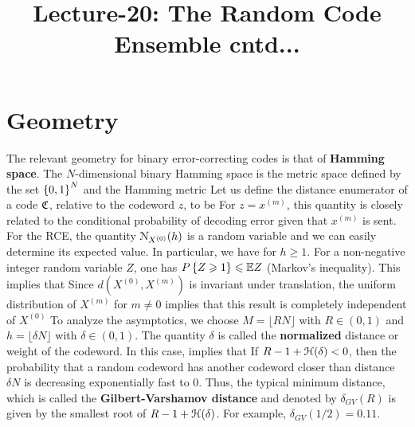 \documentclass[letterpaper,english,10pt]{article}
\title{Lecture-20: The Random Code Ensemble cntd...}
\begin{document}
\maketitle

\section{Geometry}

The relevant geometry for binary error-correcting codes is that of \textbf{Hamming space}. 
The $N$-dimensional binary Hamming space is the metric space defined by the set  $\left\{0,1\right\}^N$ and the Hamming metric
Let us define the distance enumerator of a code $\mathfrak{C}$, relative to the codeword $z$, to be
For $ z = x^{(m)}$, this quantity is closely related to the conditional probability of decoding error given that $x^{(m)}$ is sent.
For the RCE, the quantity $\mathcal{N}_{X^{(0)}}(h)$ is a random variable and we can easily determine its expected value. 
In particular, we have 
for $h  \ge 1$. 
For a non-negative integer random variable $Z$, one has $P\left\{Z \geqslant 1\right\} \leqslant \mathbb{E} Z$ (Markov's inequality). 
This implies that
Since $d(X^{(0)},X^{(m)})$ is invariant under translation, 
the uniform distribution of $X^{(m)}$ for $m \neq 0$ implies that this result is completely independent of $X^{(0)}$
To analyze the asymptotics, we choose $M=\lfloor RN\rfloor$ with $R \in (0,1)$ and $h = \lfloor\delta N\rfloor$ with
$\delta \in (0,1)$. 
The quantity $\delta$ is called the \textbf{normalized} distance or weight of the codeword. 
In this case, 
implies that 
If $R-1+\mathcal{H}(\delta) < 0$, then the probability that a random codeword has another codeword closer than distance $\delta N$ is decreasing exponentially fast to $0$. 
Thus, the typical minimum distance, which is called the \textbf{Gilbert-Varshamov distance} and denoted by $\delta_{GV}(R)$ is given by the smallest root of $R-1+\mathcal{H}(\delta)$. 
For example, $\delta_{GV}(1/2) = 0.11$. 
\end{document}
